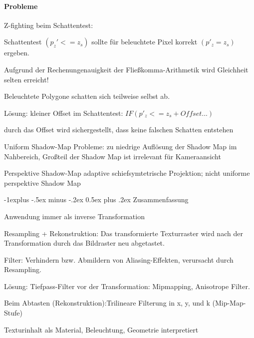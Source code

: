 \documentclass[landscape]{article}
\makeatletter
\renewcommand{\subsection}{\@startsection{subsection}{2}{0mm}%
                                {-1explus -.5ex minus -.2ex}%
                                {0.5ex plus .2ex}%
                                {\normalfont\normalsize\bfseries}}
\makeatother
\begin{document}
\begin{multicols}{3}
  \paragraph{Probleme}
  Z-fighting beim Schattentest:
  \begin{itemize*}
    \item Schattentest $(p_z' <= z_s )$ sollte für beleuchtete Pixel korrekt $(p'_z = z_s)$ ergeben.
    \item Aufgrund der Rechenungenauigkeit der Fließkomma-Arithmetik wird Gleichheit selten erreicht!
    \item Beleuchtete Polygone schatten sich teilweise selbst ab.
    \item Lösung: kleiner Offset im Schattentest: $IF (p'_z <= z_s + Offset...)$
    \item durch das Offset wird sichergestellt, dass keine falschen Schatten entstehen
  \end{itemize*}
  \begin{description*}
    \item[Uniform Shadow-Map] Probleme: zu niedrige Auflösung der Shadow Map im Nahbereich, Großteil der Shadow Map ist irrelevant für Kameraansicht
    \item[Perspektive Shadow-Map] adaptive schiefsymtetrische Projektion; nicht uniforme perspektive Shadow Map
  \end{description*}
  
  \subsection{Zusammenfassung}
  \begin{itemize*}
    \item Anwendung immer als inverse Transformation
    \item Resampling + Rekonstruktion: Das transformierte Texturraster wird nach der Transformation durch das Bildraster neu abgetastet.
    \item Filter: Verhindern bzw. Abmildern von Aliasing-Effekten, verursacht durch Resampling.
    \item Lösung: Tiefpass-Filter vor der Transformation: Mipmapping, Anisotrope Filter.
    \item Beim Abtasten (Rekonstruktion):Trilineare Filterung in x, y, und k (Mip-Map-Stufe)
    \item Texturinhalt als Material, Beleuchtung, Geometrie interpretiert
  \end{itemize*}
  
\end{multicols}
\end{document}
